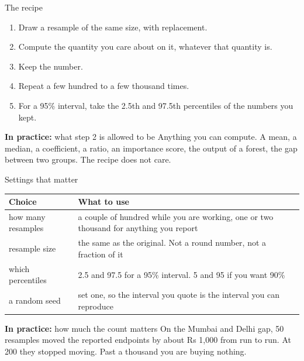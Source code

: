 \documentclass[aspectratio=169]{beamer}
\newenvironment{practice}[1]{\begin{exampleblock}{\textbf{In practice:} #1}}{\end{exampleblock}}
\begin{document}
\begin{frame}{The recipe}
\begin{enumerate}
  \item Draw a resample of the same size, with replacement.
  \item Compute the quantity you care about on it, whatever that quantity is.
  \item Keep the number.
  \item Repeat a few hundred to a few thousand times.
  \item For a 95\% interval, take the 2.5th and 97.5th percentiles of the numbers you kept.
\end{enumerate}
\vspace{0.2em}
\begin{practice}{what step 2 is allowed to be}
Anything you can compute. A mean, a median, a coefficient, a ratio, an importance score, the
output of a forest, the gap between two groups. The recipe does not care.
\end{practice}
\end{frame}

\begin{frame}{Settings that matter}
\begin{center}\small
\begin{tabular}{L{0.26\textwidth} L{0.62\textwidth}}
\toprule
\textbf{Choice} & \textbf{What to use} \\
\midrule
how many resamples &
a couple of hundred while you are working, one or two thousand for anything you report \\
resample size &
the same as the original. Not a round number, not a fraction of it \\
which percentiles &
2.5 and 97.5 for a 95\% interval. 5 and 95 if you want 90\% \\
a random seed &
set one, so the interval you quote is the interval you can reproduce \\
\bottomrule
\end{tabular}
\end{center}
\vspace{0.2em}
\begin{practice}{how much the count matters}
On the Mumbai and Delhi gap, 50 resamples moved the reported endpoints by about Rs 1,000 from
run to run. At 200 they stopped moving. Past a thousand you are buying nothing.
\end{practice}
\end{frame}
\end{document}
